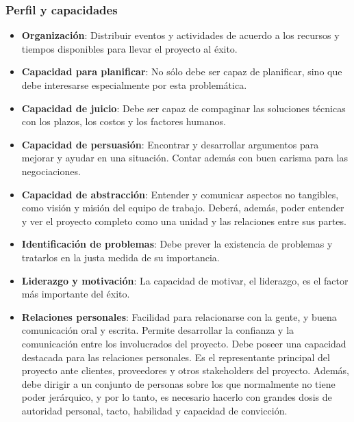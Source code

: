         \subsubsection{Perfil y capacidades}
            \begin{itemize}
                \item \textbf{Organización}:
                Distribuir eventos y actividades de acuerdo a los recursos y tiempos disponibles para llevar el proyecto al éxito.
                
                \item \textbf{Capacidad para planificar}:
                No sólo debe ser capaz de planificar, sino que debe interesarse especialmente por esta problemática.
                
                \item \textbf{Capacidad de juicio}:
                Debe ser capaz de compaginar las soluciones técnicas con los plazos, los costos y los factores humanos.
                
                \item \textbf{Capacidad de persuasión}:
                Encontrar y desarrollar argumentos para mejorar y ayudar en una situación.
                Contar además con buen carisma para las negociaciones.
                
                \item \textbf{Capacidad de abstracción}:
                Entender y comunicar aspectos no tangibles, como visión y misión del equipo de trabajo.
                Deberá, además, poder entender y ver el proyecto completo como una unidad y las relaciones entre sus partes.
                
                \item \textbf{Identificación de problemas}:
                Debe prever la existencia de problemas y tratarlos en la justa medida de su importancia.
                
                \item \textbf{Liderazgo y motivación}:
                La capacidad de motivar, el liderazgo, es el factor más importante del éxito.
                
                \item \textbf{Relaciones personales}:
                Facilidad para relacionarse con la gente, y buena comunicación oral y escrita.
                Permite desarrollar la confianza y la comunicación entre los involucrados del proyecto.
                Debe poseer una capacidad destacada para las relaciones personales.
                Es el representante principal del proyecto ante clientes, proveedores y otros stakeholders del proyecto.
                Además, debe dirigir a un conjunto de personas sobre los que normalmente no tiene poder jerárquico, y por lo tanto, es necesario hacerlo con grandes dosis de autoridad personal, tacto, habilidad y capacidad de convicción.
                

\end{itemize}
